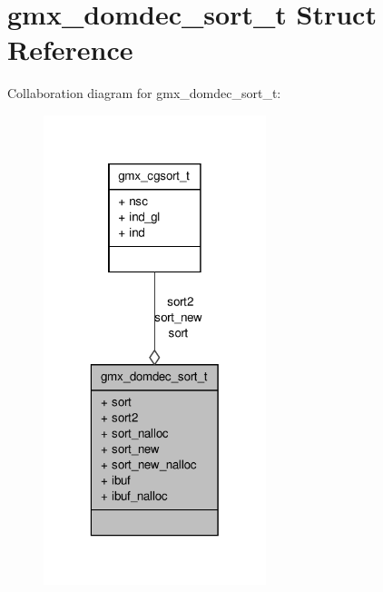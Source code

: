 \hypertarget{structgmx__domdec__sort__t}{\section{gmx\-\_\-domdec\-\_\-sort\-\_\-t \-Struct \-Reference}
\label{structgmx__domdec__sort__t}
}


\-Collaboration diagram for gmx\-\_\-domdec\-\_\-sort\-\_\-t\-:
\nopagebreak
\begin{figure}[H]
\begin{center}
\leavevmode
\includegraphics[width=184pt]{structgmx__domdec__sort__t__coll__graph}
\end{center}
\end{figure}
